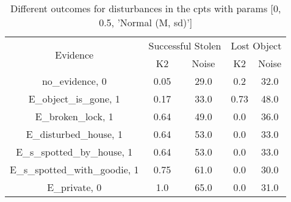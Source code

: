 \begin{table}\begin{tabular}{c|cc|cc}\toprule\multirow{2}{*}{Evidence} & \multicolumn{2}{c}{Successful Stolen} & \multicolumn{2}{c}{Lost Object} \\& {K2} & {Noise} & {K2} & {Noise} \\\midrule
no\_evidence, 0 & \cellcolor{Bittersweet}0.05&\cellcolor{Bittersweet}29.0&\cellcolor{Bittersweet}0.2&\cellcolor{Bittersweet}32.0\\E\_object\_is\_gone, 1 & \cellcolor{Bittersweet}0.17&\cellcolor{Bittersweet}33.0&\cellcolor{Bittersweet}0.73&\cellcolor{Bittersweet}48.0\\E\_broken\_lock, 1 & \cellcolor{Bittersweet}0.64&\cellcolor{Bittersweet}49.0&\cellcolor{Bittersweet}0.0&\cellcolor{Bittersweet}36.0\\E\_disturbed\_house, 1 & \cellcolor{Bittersweet}0.64&\cellcolor{Bittersweet}53.0&\cellcolor{Bittersweet}0.0&\cellcolor{Bittersweet}33.0\\E\_s\_spotted\_by\_house, 1 & \cellcolor{Bittersweet}0.64&\cellcolor{Bittersweet}53.0&\cellcolor{Bittersweet}0.0&\cellcolor{Bittersweet}33.0\\E\_s\_spotted\_with\_goodie, 1 & \cellcolor{Bittersweet}0.75&\cellcolor{Bittersweet}61.0&\cellcolor{Bittersweet}0.0&\cellcolor{Bittersweet}30.0\\E\_private, 0 & \cellcolor{Bittersweet}1.0&\cellcolor{Bittersweet}65.0&\cellcolor{Bittersweet}0.0&\cellcolor{Bittersweet}31.0\\\bottomrule\end{tabular}\caption{Different outcomes for disturbances in the cpts with params [0, 0.5, 'Normal (M, sd)']}\end{table}